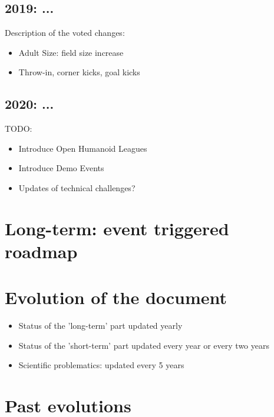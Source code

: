 \documentclass{article}
\begin{document}
\subsection{2019: ...}

Description of the voted changes:
\begin{itemize}
\item Adult Size: field size increase
\item Throw-in, corner kicks, goal kicks
\end{itemize}

\subsection{2020: ...}

TODO: 
\begin{itemize}
\item Introduce Open Humanoid Leagues
\item Introduce Demo Events
\item Updates of technical challenges?
\end{itemize}

\section{Long-term: event triggered roadmap}
\begin{sidewaysfigure}

\end{sidewaysfigure}

\section{Evolution of the document}

\begin{itemize}
\item Status of the 'long-term' part updated yearly
\item Status of the 'short-term' part updated every year or every two years
\item Scientific problematics: updated every 5 years
\end{itemize}

\section{Past evolutions}
\end{document}
